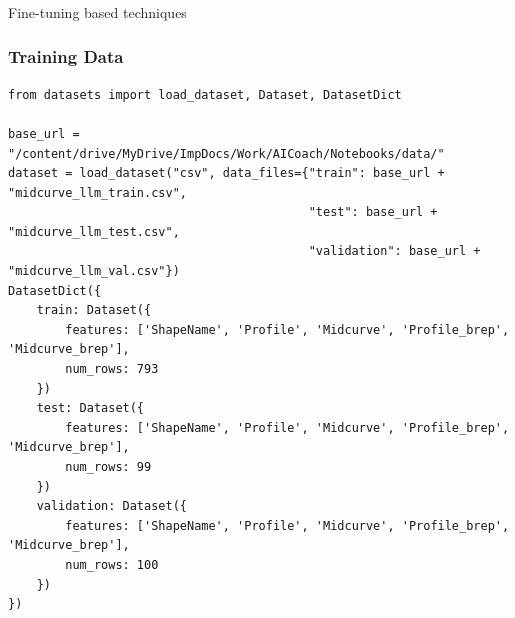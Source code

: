 \begin{frame}[fragile]\frametitle{}
\begin{center}
{\Large Fine-tuning based techniques}
\end{center}
\end{frame}


\begin{frame}[fragile]\frametitle{Training Data}

\begin{lstlisting}[basicstyle=\tiny, breaklines=true, breakatwhitespace=true,label=lst:python]
from datasets import load_dataset, Dataset, DatasetDict

base_url = "/content/drive/MyDrive/ImpDocs/Work/AICoach/Notebooks/data/"
dataset = load_dataset("csv", data_files={"train": base_url + "midcurve_llm_train.csv",
                                          "test": base_url + "midcurve_llm_test.csv",
                                          "validation": base_url + "midcurve_llm_val.csv"})
DatasetDict({
    train: Dataset({
        features: ['ShapeName', 'Profile', 'Midcurve', 'Profile_brep', 'Midcurve_brep'],
        num_rows: 793
    })
    test: Dataset({
        features: ['ShapeName', 'Profile', 'Midcurve', 'Profile_brep', 'Midcurve_brep'],
        num_rows: 99
    })
    validation: Dataset({
        features: ['ShapeName', 'Profile', 'Midcurve', 'Profile_brep', 'Midcurve_brep'],
        num_rows: 100
    })
})

\end{lstlisting}

\end{frame}

